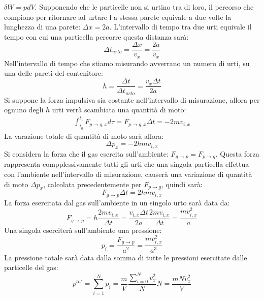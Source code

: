 \documentclass{article}
\numberwithin{equation}{subsection}
\begin{document}
$\delta W=pdV$. Supponendo che le particelle non si urtino 
tra di loro, il percorso che compiono per ritornare ad urtare l
a stessa parete equivale a due volte la lunghezza di una parete: $\Delta x=2a$. 
L'intervallo di tempo tra due urti equivale il tempo con 
cui una particella percorre questa distanza sarà: 
\begin{equation}
    \Delta t_{urto}=\displaystyle\frac{\Delta x}{v_x}=\frac{2a}{v_x}
\end{equation}
Nell'intervallo di tempo che stiamo misurando avverrano 
un numero di urti, su una delle pareti del contenitore: 
\begin{equation}
    h=\displaystyle\frac{\Delta t}{\Delta t_{urto}}=\frac{v_x\Delta t}{2a}
\end{equation}
Si suppone la forza impulsiva sia costante nell'intervallo di 
misurazione, allora per ognuno degli $h$ urti verrà scambiata una 
quantità di moto:
\begin{gather}
    \int_{t_0}^{t_1}F_{p\to g,x}d\tau=F_{p\to g,x}\Delta t=-2mv_{i,x}
\end{gather}
La varazione totale di quantità di moto sarà allora:
\begin{equation}
    \Delta p_x=-2hmv_{i,x}
\end{equation}
Si considera la forza che il gas esercita sull'ambiente: $F_{g\to p}=F_{p\to g}$. 
Questa forza rappresenta compplessivamente tutti gli urti che 
una singola particella effettua con l'ambiente nell'intervallo 
di misurazione, causerà una variazione di quantità di moto $\Delta p_x$, 
calcolata precedentemente per $F_{p\to g}$, quindi sarà:
\begin{equation}
    F_{g\to p}\Delta t=2hmv_{i,x}
\end{equation}
La forza esercitata dal gas sull'ambiente in un singolo 
urto sarà data da:
\begin{equation}
    F_{g\to p}=\displaystyle h\frac{2mv_{i,x}}{\Delta t}=\frac{v_{i,x}\Delta t}{2a}\frac{2mv_{i,x}}{\Delta t}=\frac{mv_{i,x}^2}{a}
\end{equation} 
Una singola eserciterà sull'ambiente una pressione:
\begin{equation}
    p_i=\displaystyle\frac{F_{g\to p}}{a^2}=\frac{mv_{i,x}^2}{a^3}
\end{equation}
La pressione totale sarà data dalla somma di tutte le 
pressioni esercitate dalle particelle del gas:
\begin{equation}
    p^{tot}=\sum_{i=1}^{N}p_i=\displaystyle\frac{m}{V}\frac{\sum_{i=0}^Nv_x^2}{N}N=\frac{mN\bar{v}_x^2}{V}
\end{equation}
\end{document}
